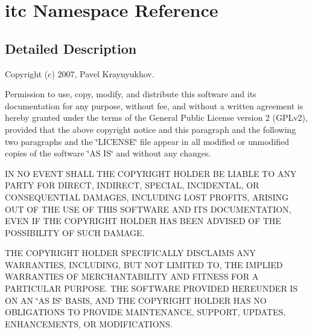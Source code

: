 \hypertarget{namespaceitc}{\section{itc Namespace Reference}
\label{namespaceitc}
}


\subsection{Detailed Description}
Copyright (c) 2007, Pavel Kraynyukhov.

Permission to use, copy, modify, and distribute this software and its documentation for any purpose, without fee, and without a written agreement is hereby granted under the terms of the General Public License version 2 (G\-P\-Lv2), provided that the above copyright notice and this paragraph and the following two paragraphs and the \char`\"{}\-L\-I\-C\-E\-N\-S\-E\char`\"{} file appear in all modified or unmodified copies of the software \char`\"{}\-A\-S I\-S\char`\"{} and without any changes.

I\-N N\-O E\-V\-E\-N\-T S\-H\-A\-L\-L T\-H\-E C\-O\-P\-Y\-R\-I\-G\-H\-T H\-O\-L\-D\-E\-R B\-E L\-I\-A\-B\-L\-E T\-O A\-N\-Y P\-A\-R\-T\-Y F\-O\-R D\-I\-R\-E\-C\-T, I\-N\-D\-I\-R\-E\-C\-T, S\-P\-E\-C\-I\-A\-L, I\-N\-C\-I\-D\-E\-N\-T\-A\-L, O\-R C\-O\-N\-S\-E\-Q\-U\-E\-N\-T\-I\-A\-L D\-A\-M\-A\-G\-E\-S, I\-N\-C\-L\-U\-D\-I\-N\-G L\-O\-S\-T P\-R\-O\-F\-I\-T\-S, A\-R\-I\-S\-I\-N\-G O\-U\-T O\-F T\-H\-E U\-S\-E O\-F T\-H\-I\-S S\-O\-F\-T\-W\-A\-R\-E A\-N\-D I\-T\-S D\-O\-C\-U\-M\-E\-N\-T\-A\-T\-I\-O\-N, E\-V\-E\-N I\-F T\-H\-E C\-O\-P\-Y\-R\-I\-G\-H\-T H\-O\-L\-D\-E\-R H\-A\-S B\-E\-E\-N A\-D\-V\-I\-S\-E\-D O\-F T\-H\-E P\-O\-S\-S\-I\-B\-I\-L\-I\-T\-Y O\-F S\-U\-C\-H D\-A\-M\-A\-G\-E.

T\-H\-E C\-O\-P\-Y\-R\-I\-G\-H\-T H\-O\-L\-D\-E\-R S\-P\-E\-C\-I\-F\-I\-C\-A\-L\-L\-Y D\-I\-S\-C\-L\-A\-I\-M\-S A\-N\-Y W\-A\-R\-R\-A\-N\-T\-I\-E\-S, I\-N\-C\-L\-U\-D\-I\-N\-G, B\-U\-T N\-O\-T L\-I\-M\-I\-T\-E\-D T\-O, T\-H\-E I\-M\-P\-L\-I\-E\-D W\-A\-R\-R\-A\-N\-T\-I\-E\-S O\-F M\-E\-R\-C\-H\-A\-N\-T\-A\-B\-I\-L\-I\-T\-Y A\-N\-D F\-I\-T\-N\-E\-S\-S F\-O\-R A P\-A\-R\-T\-I\-C\-U\-L\-A\-R P\-U\-R\-P\-O\-S\-E. T\-H\-E S\-O\-F\-T\-W\-A\-R\-E P\-R\-O\-V\-I\-D\-E\-D H\-E\-R\-E\-U\-N\-D\-E\-R I\-S O\-N A\-N \char`\"{}\-A\-S I\-S\char`\"{} B\-A\-S\-I\-S, A\-N\-D T\-H\-E C\-O\-P\-Y\-R\-I\-G\-H\-T H\-O\-L\-D\-E\-R H\-A\-S N\-O O\-B\-L\-I\-G\-A\-T\-I\-O\-N\-S T\-O P\-R\-O\-V\-I\-D\-E M\-A\-I\-N\-T\-E\-N\-A\-N\-C\-E, S\-U\-P\-P\-O\-R\-T, U\-P\-D\-A\-T\-E\-S, E\-N\-H\-A\-N\-C\-E\-M\-E\-N\-T\-S, O\-R M\-O\-D\-I\-F\-I\-C\-A\-T\-I\-O\-N\-S.

